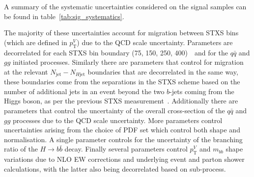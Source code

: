 A summary of the systematic uncertainties considered on the signal samples can
be found in table~\ref{tab:sig_systematics}.

The majority of these uncertainties account for migration between STXS bins
(which are defined in $p_{\mathrm{T}}^V$) due to the QCD scale uncertainty.
Parameters are decorrelated for each STXS bin boundary (75, 150, 250, 400)~\GeV\
and for the $q\bar{q}$ and $gg$ initiated processes. Similarly there are
parameters that control for migration at the relevant $N_{\text{jet}} -
N_{H\text{jet}}$ boundaries that are decorrelated in the same way, these
boundaries come from the separations in the STXS scheme based on the number of
additional jets in an event beyond the two $b$-jets coming from the Higgs boson,
as per the previous STXS measurement~\cite{STXSpaper}. Additionally
there are parameters that control the uncertainty of the overall cross-section
of the $q\bar{q}$ and $gg$ processes due to the QCD scale uncertainty. More
parameters control uncertainties arising from the choice of PDF set which
control both shape and normalisation. A single parameter controls for the
uncertainty of the branching ratio of the $H \to b{\bar{b}}$ decay. Finally
several parameters control  $p_{\mathrm{T}}^V$ and $m_{bb}$ shape variations due
to NLO EW corrections and underlying event and parton shower calculations, with
the latter also being decorrelated based on sub-process.